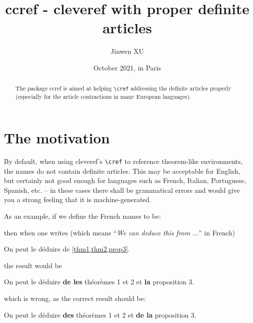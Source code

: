 \documentclass[classical]{einfart}
\newenvironment{demo}{%
    \LocallyStopLineNumbers%
    \begin{tcolorbox}[enhanced jigsaw,pad at break*=1mm,breakable,
        left=4mm,right=4mm,top=1mm,bottom=1mm,
        colback=gray!5!paper,boxrule=0pt,frame hidden,
        borderline west={1.5mm}{0mm}{gray!55!paper},arc=.7mm]%
}{\end{tcolorbox}\ResumeLineNumbers}
\newcommand{\ccrefpackage}{\textsf{ccref}}
\begin{document}
\title{\ccrefpackage{} - cleveref with proper definite articles}
\author{Jinwen XU}
\date{October 2021, in Paris}

\maketitle

\begin{abstract}
    \raggedleft
    The package \ccrefpackage{} is aimed at helping \lstinline|\cref| addressing the definite articles properly (especially for the article contractions in many European languages).
\end{abstract}

\section{The motivation}

By default, when using \textsf{cleveref}'s \lstinline|\cref| to reference theorem-like environments, the names do not contain definite articles. This may be acceptable for English, but certainly not good enough for languages such as French, Italian, Portuguese, Spanish, etc. -- in these cases there shall be grammatical errors and would give you a strong feeling that it is machine-generated.

As an example, if we define the French names to be:

\begin{code}
\end{code}

then when one writes (which means ``\emph{We can deduce this from ...}'' in French)

\begin{code}
On peut le déduire de \cref{thm1,thm2,prop3}.
\end{code}

the result would be

\begin{demo}
    On peut le déduire \textbf{de les} théorèmes 1 et 2 et \textbf{la} proposition 3.
\end{demo}

which is wrong, as the correct result should be:

\begin{demo}
    On peut le déduire \textbf{des} théorèmes 1 et 2 et \textbf{de la} proposition 3.
\end{demo}
\end{document}
